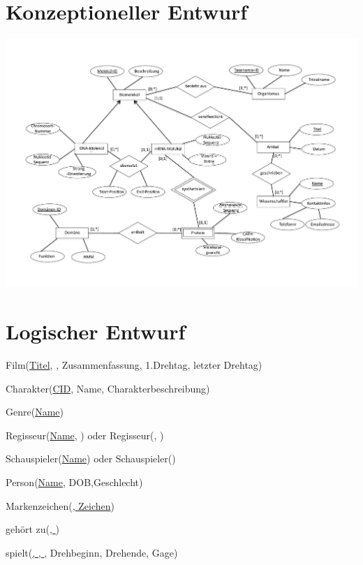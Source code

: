 \documentclass[a4paper,12pt]{scrartcl}
\begin{document}
\section{Konzeptioneller Entwurf}

\centerline{\includegraphics[scale=0.5]{A1_ERM.pdf}} \par 

\section{Logischer Entwurf}

Film(\underline{Titel}, , Zusammenfassung, 1.Drehtag, letzter Drehtag)

Charakter(\underline{CID}, Name, Charakterbeschreibung)

Genre(\underline{Name})

Regisseur(\underline{Name}, ) oder Regisseur(\underline{}, )

Schauspieler(\underline{Name}) oder Schauspieler(\underline{})

Person(\underline{Name}, DOB,Geschlecht)

Markenzeichen(\underline{, Zeichen})

geh\"ort zu(\underline{, })

spielt(\underline{, , }, Drehbeginn, Drehende, Gage)
\end{document}
